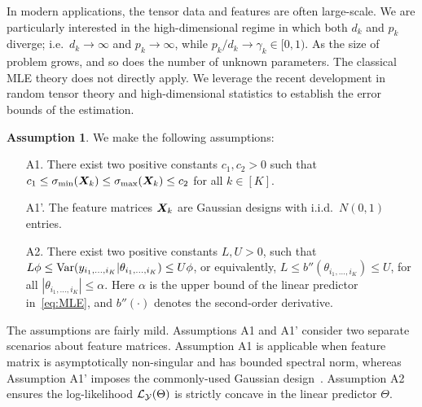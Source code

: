 \documentclass[12pt]{article}
\theoremstyle{definition}
\theoremstyle{definition}
\newtheorem{assumption}{Assumption}
\begin{document}
In modern applications, the tensor data and features are often large-scale. We are particularly interested in the high-dimensional regime in which both $d_k$ and $p_k$ diverge; i.e.\ $d_k\to \infty$ and $p_k\to\infty$, while $p_k/d_k \to \gamma_k \in[0,1)$. As the size of problem grows, and so does the number of unknown parameters. The classical MLE theory does not directly apply. We leverage the recent development in random tensor theory and high-dimensional statistics to establish the error bounds of the estimation. 

 
\begin{assumption}\label{ass}We make the following assumptions:
\begin{enumerate}[noitemsep,topsep=0pt]
\item [A1.] There exist two positive constants $c_1, c_2>0$ such that $c_1\leq \sigma_{\min}(\bm X_k)\leq  \sigma_{\max}(\bm X_k)\leq c_2$ for all $k\in[K]$. 
\item [A1'.] The feature matrices $\bm X_k$ are Gaussian designs with i.i.d.\ $N(0,1)$ entries.
\item [A2.] There exist two positive constants $L, U>0$, such that $L\phi \leq \textup{Var}(y_{i_1,\ldots,i_K}|\theta_{i_1,\ldots,i_K})\leq U\phi $, or equivalently, $L\leq b''(\theta_{i_1,\ldots,i_K}) \leq U$, for all $|\theta_{i_1,\ldots,i_K}|\leq \alpha$. Here $\alpha$ is the upper bound of the linear predictor in~\eqref{eq:MLE}, and $b''(\cdot)$ denotes the second-order derivative. 

\end{enumerate}
\end{assumption}
The assumptions are fairly mild. Assumptions A1 and A1' consider two separate scenarios about feature matrices. Assumption A1 is applicable when feature matrix is asymptotically non-singular and has bounded spectral norm, whereas Assumption A1' imposes the commonly-used Gaussian design~\citep{raskutti2019convex}. Assumption A2 ensures the log-likelihood $\mathcal{L}_{\mathcal{Y}}(\Theta)$ is strictly concave in the linear predictor $\Theta$. 
\end{document}
